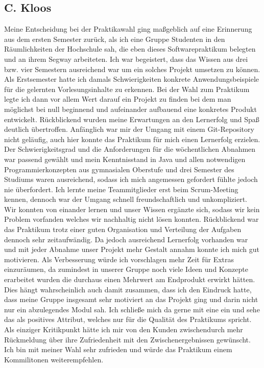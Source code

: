 \documentclass[oneside,abstractoff,a4paper]{scrartcl}
\begin{document}
\subsection{C. Kloos}
Meine Entscheidung bei der Praktikawahl ging maßgeblich auf eine Erinnerung aus dem ersten Semester zurück, als ich eine Gruppe Studenten in den Räumlichkeiten der Hochschule sah, die eben dieses Softwarepraktikum belegten und an ihrem Segway arbeiteten. Ich war begeistert, dass das Wissen aus drei bzw. vier Semestern ausreichend war um ein solches Projekt umsetzen zu können. Als Erstsemester hatte ich damals Schwierigkeiten konkrete Anwendungsbeispiele für die gelernten Vorlesungsinhalte zu erkennen. Bei der Wahl zum Praktikum legte ich dann vor allem Wert darauf ein Projekt zu finden bei dem man möglichst bei null beginnend und aufeinander aufbauend eine konkretes Produkt entwickelt. Rückblickend wurden meine Erwartungen an den Lernerfolg und Spaß deutlich übertroffen. 
Anfänglich war mir der Umgang mit einem Git-Repository nicht geläufig, auch hier konnte das Praktikum für mich einen Lernerfolg erzielen. Der Schwierigkeitsgrad und die Anforderungen für die wöchentlichen Abnahmen war passend gewählt und mein Kenntnisstand in Java und allen notwendigen Programmierkonzepten aus gymnasialen Oberstufe und drei Semester des Studiums waren ausreichend, sodass ich mich angemessen gefordert fühlte jedoch nie überfordert. Ich lernte meine Teammitglieder erst beim Scrum-Meeting kennen, dennoch war der Umgang schnell freundschaftlich und unkompliziert. Wir konnten von einander lernen und unser Wissen ergänzte sich, sodass wir kein Problem vorfanden welches wir nachhaltig nicht lösen konnten. Rückblickend war das Praktikum trotz einer guten Organisation und Verteilung der Aufgaben dennoch sehr zeitaufwändig. Da jedoch ausreichend Lernerfolg vorhanden war und mit jeder Abnahme unser Projekt mehr Gestalt annahm konnte ich mich gut motivieren. Als Verbesserung würde ich vorschlagen mehr Zeit für Extras einzuräumen, da zumindest in unserer Gruppe noch viele Ideen und Konzepte erarbeitet wurden die durchaus einen Mehrwert am Endprodukt erwirkt hätten. Dies hängt wahrscheinlich auch damit zusammen, dass ich den Eindruck hatte, dass meine Gruppe insgesamt sehr motiviert an das Projekt ging und darin nicht nur ein abzulegendes Modul sah. Ich schließe mich da gerne mit eine ein und sehe das als positives Attribut, welches nur für die Qualität des Praktikums spricht. Als einziger Kritikpunkt hätte ich mir von den Kunden zwischendurch mehr Rückmeldung über ihre Zufriedenheit mit den Zwischenergebnissen gewünscht.\\Ich bin mit meiner Wahl sehr zufrieden und würde das Praktikum einem Kommilitonen weiterempfehlen.
\end{document}

